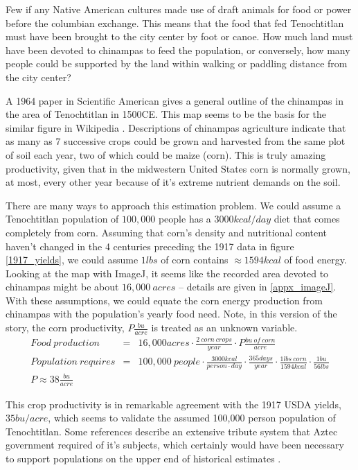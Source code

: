 \documentclass[12pt]{iopart}
\newcommand{\bea}{\begin{eqnarray}}
\newcommand{\eea}{\end{eqnarray}}
\begin{document}
Few if any Native American cultures made use of draft animals for food or power before the columbian exchange.  This means that the food that fed Tenochtitlan must have been brought to the city center by foot or canoe.  How much land must have been devoted to chinampas to feed the population, or conversely, how many people could be supported by the land within walking or paddling distance from the city center?

A 1964 paper in Scientific American \cite{Chinampas_1964} gives a general outline of the chinampas in the area of Tenochtitlan in 1500CE.  This map seems to be the basis for the similar figure in Wikipedia \cite{chinampas_wikipedia}.  Descriptions of chinampas agriculture indicate that as many as 7 successive crops could be grown and harvested from the same plot of soil each year, two of which could be maize (corn).  This is truly amazing productivity, given that in the midwestern United States corn is normally grown, at most, every other year because of it's extreme nutrient demands on the soil.

There are many ways to approach this estimation problem.  We could assume a Tenochtitlan population of $100,000$ people has a $3000kcal/day$ diet that comes completely from corn.  Assuming that corn's density and nutritional content haven't changed in the 4 centuries preceding the 1917 data in figure \ref{1917_yields}, we could assume $1lbs$ of corn contains $\approx1594kcal$ of food energy.  
Looking at the map with ImageJ, it seems like the recorded area devoted to chinampas might be about
$16,000~acres$ -- details are given in \ref{appx_imageJ}.
With these assumptions, we could equate the corn energy production from chinampas with the population's yearly food need. Note, in this version of the story, the corn productivity, $P\frac{bu}{acre}$ is treated as an unknown variable.  
\bea
Food~production &=& 16,000acres\cdot \frac{2~corn~crops}{year}\cdot P \frac{bu~of~corn}{acre} \nonumber \\
Population~requires &=& 100,000~people\cdot \frac{3000kcal}{person\cdot day}\cdot\frac{365days}{year}\cdot\frac{1lbs~corn}{1594kcal}\cdot\frac{1bu}{56lbs} \nonumber \\
P \approx 38\frac{bu}{acre} && 
\eea

This crop productivity is in remarkable agreement with the 1917 USDA yields, $35bu/acre$, which seems to validate the assumed 100,000 person population of Tenochtitlan.  Some references \cite{Chinampas_1964} describe an extensive tribute system that Aztec government required of it's subjects, which certainly would have been necessary to support populations on the upper end of historical estimates \cite{400k}.
\end{document}
